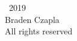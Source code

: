 
\thispagestyle{empty} %
\null\vfill %
\begin{center}
\SingleSpace %
\textcopyright \ 2019\\
Braden Czapla\\
All rights reserved\\
\end{center}
